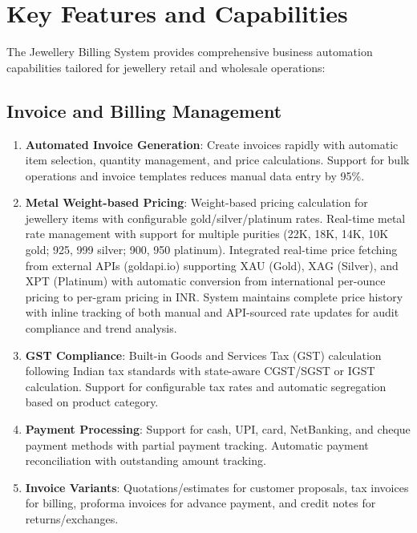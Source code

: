 \documentclass[12pt,a4paper]{report}
\begin{document}
\section{Key Features and Capabilities}

The Jewellery Billing System provides comprehensive business automation capabilities tailored for jewellery retail and wholesale operations:

\subsection{Invoice and Billing Management}
\begin{enumerate}[label=\roman*)]
    \item \textbf{Automated Invoice Generation}: Create invoices rapidly with automatic item selection, quantity management, and price calculations. Support for bulk operations and invoice templates reduces manual data entry by 95\%.
    \item \textbf{Metal Weight-based Pricing}: Weight-based pricing calculation for jewellery items with configurable gold/silver/platinum rates. Real-time metal rate management with support for multiple purities (22K, 18K, 14K, 10K gold; 925, 999 silver; 900, 950 platinum). Integrated real-time price fetching from external APIs (goldapi.io) supporting XAU (Gold), XAG (Silver), and XPT (Platinum) with automatic conversion from international per-ounce pricing to per-gram pricing in INR. System maintains complete price history with inline tracking of both manual and API-sourced rate updates for audit compliance and trend analysis.
    \item \textbf{GST Compliance}: Built-in Goods and Services Tax (GST) calculation following Indian tax standards with state-aware CGST/SGST or IGST calculation. Support for configurable tax rates and automatic segregation based on product category.
    \item \textbf{Payment Processing}: Support for cash, UPI, card, NetBanking, and cheque payment methods with partial payment tracking. Automatic payment reconciliation with outstanding amount tracking.
    \item \textbf{Invoice Variants}: Quotations/estimates for customer proposals, tax invoices for billing, proforma invoices for advance payment, and credit notes for returns/exchanges.
\end{enumerate}
\end{document}
